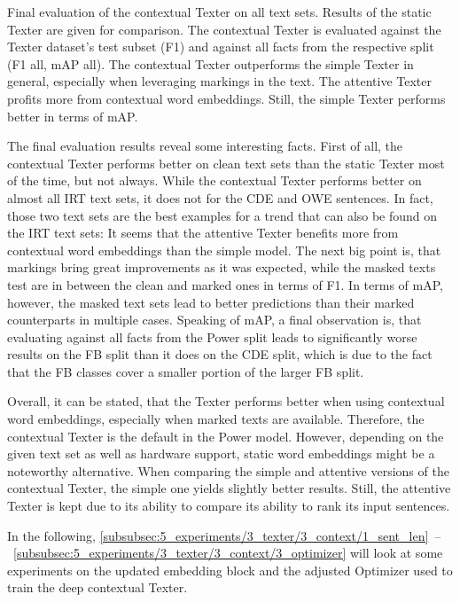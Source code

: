 \begin{table}
    \centering
    
    \caption{Final evaluation of the contextual Texter on all text sets. Results of the static Texter are given for comparison. The contextual Texter is evaluated against the Texter dataset's test subset (F1) and against all facts from the respective split (F1 all, mAP all). The contextual Texter outperforms the simple Texter in general, especially when leveraging markings in the text. The attentive Texter profits more from contextual word embeddings. Still, the simple Texter performs better in terms of mAP.}
    \label{tab:5_experiments/3_texter/3_context/results}
\end{table}

The final evaluation results reveal some interesting facts. First of all, the contextual Texter performs better on clean text sets than the static Texter most of the time, but not always. While the contextual Texter performs better on almost all IRT text sets, it does not for the CDE and OWE sentences. In fact, those two text sets are the best examples for a trend that can also be found on the IRT text sets: It seems that the attentive Texter benefits more from contextual word embeddings than the simple model. The next big point is, that markings bring great improvements as it was expected, while the masked texts test are in between the clean and marked ones in terms of F1. In terms of mAP, however, the masked text sets lead to better predictions than their marked counterparts in multiple cases. Speaking of mAP, a final observation is, that evaluating against all facts from the Power split leads to significantly worse results on the FB split than it does on the CDE split, which is due to the fact that the FB classes cover a smaller portion of the larger FB split.

Overall, it can be stated, that the Texter performs better when using contextual word embeddings, especially when marked texts are available. Therefore, the contextual Texter is the default in the Power model. However, depending on the given text set as well as hardware support, static word embeddings might be a noteworthy alternative. When comparing the simple and attentive versions of the contextual Texter, the simple one yields slightly better results. Still, the attentive Texter is kept due to its ability to compare its ability to rank its input sentences.

In the following, \autoref{subsubsec:5_experiments/3_texter/3_context/1_sent_len}~--~\ref{subsubsec:5_experiments/3_texter/3_context/3_optimizer} will look at some experiments on the updated embedding block and the adjusted Optimizer used to train the deep contextual Texter.

